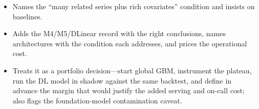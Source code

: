 \begin{interviewq}

\goodgreat
\begin{itemize}
    \item {} Names the ``many related series plus rich covariates'' condition and insists on baselines.
    \item {} Adds the M4/M5/DLinear record with the right conclusions, names architectures with the condition each addresses, and prices the operational cost.
    \item {} Treats it as a portfolio decision---start global GBM, instrument the plateau, run the DL model in shadow against the same backtest, and define in advance the margin that would justify the added serving and on-call cost; also flags the foundation-model contamination caveat.
\end{itemize}

\end{interviewq}

